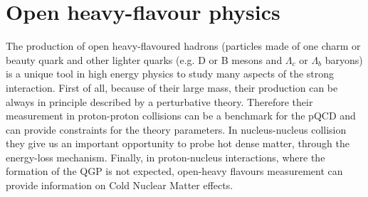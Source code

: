 \documentclass[b5paper,10pt,twoside,oldstyle,classica]{toptesi}
\begin{document}
\chapter{Open heavy-flavour physics}
The production of open heavy-flavoured hadrons (particles made of one charm or beauty quark and other lighter quarks (e.g. D or B mesons and $\Lambda_c$ or $\Lambda_b$ baryons) is a unique tool in high energy physics to study many aspects of the strong interaction. First of all, because of their large mass, their production can be always in principle described by a perturbative theory. Therefore their measurement in proton-proton collisions can be a benchmark for the pQCD and can provide constraints for the theory parameters. 
In nucleus-nucleus collision they give us an important opportunity to probe hot dense matter, through the energy-loss mechanism. Finally, in proton-nucleus interactions, where the formation of the QGP is not expected, open-heavy flavours measurement can provide information on Cold Nuclear Matter effects.
\end{document}
